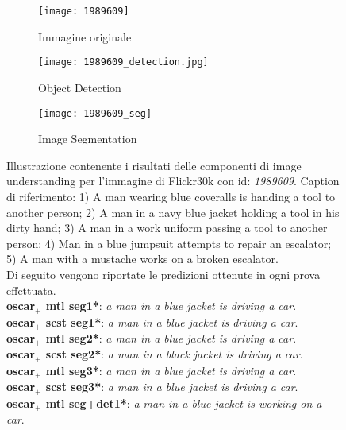 \begin{figure}[H]
     \centering
     \begin{subfigure}[b]{0.47\textwidth}
         \centering
         \texttt{[image: 1989609]}
         \caption{Immagine originale}
     \end{subfigure}
     \begin{subfigure}[b]{0.47\textwidth}
         \centering
         \texttt{[image: 1989609\_detection.jpg]}
         \caption{Object Detection}
     \end{subfigure}
     \begin{subfigure}[b]{0.47\textwidth}
         \centering
         \texttt{[image: 1989609\_seg]}
         \caption{Image Segmentation}
     \end{subfigure}
     \captionsetup{singlelinecheck=off}
        \caption{Illustrazione contenente i risultati delle componenti di image understanding per l'immagine di Flickr30k con id: \textit{1989609}.
        Caption di riferimento: 1) A man wearing blue coveralls is handing a tool to another person; 2) A man in a navy blue jacket holding a tool in his dirty hand; 3) A man in a work uniform passing a tool to another person; 4) Man in a blue jumpsuit attempts to repair an escalator; 5) A man with a mustache works on a broken escalator.\\
        Di seguito vengono riportate le predizioni ottenute in ogni prova effettuata.\\
        \textbf{\acrshort{oscar}$_+$ \acrshort{mtl} seg1*}: \textit{a man in a blue jacket is driving a car}.\\
        \textbf{\acrshort{oscar}$_+$ \acrshort{scst} seg1*}: \textit{a man in a blue jacket is driving a car}.\\
        \textbf{\acrshort{oscar}$_+$ \acrshort{mtl} seg2*}: \textit{a man in a blue jacket is driving a car}.\\
        \textbf{\acrshort{oscar}$_+$ \acrshort{scst} seg2*}: \textit{a man in a black jacket is driving a car}.\\
        \textbf{\acrshort{oscar}$_+$ \acrshort{mtl} seg3*}: \textit{a man in a blue jacket is driving a car}.\\
        \textbf{\acrshort{oscar}$_+$ \acrshort{scst} seg3*}: \textit{a man in a blue jacket is driving a car}.\\
        \textbf{\acrshort{oscar}$_+$ \acrshort{mtl} seg+det1*}: \textit{a man in a blue jacket is working on a car}.\\
}
\end{figure}
